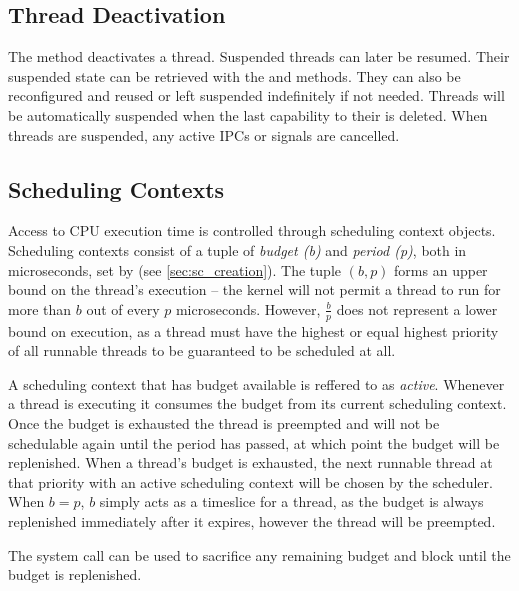 \subsection{Thread Deactivation}
\label{sec:thread_deactivation}

The  method deactivates a thread.
Suspended threads can later be resumed.
Their suspended state can be retrieved with the 
 and
 methods.
They can also be reconfigured and
reused or left suspended indefinitely if not needed. Threads will be
automatically suspended when the last capability to their  is
deleted.
When threads are suspended, any active IPCs or signals are cancelled.

\subsection{Scheduling Contexts}
\label{sec:scheduling_contexts}

Access to CPU execution time is controlled through scheduling context objects.
Scheduling contexts consist of a tuple of 
\textit{budget (b)} and \textit{period (p)}, both in microseconds, set by  (see \autoref{sec:sc_creation}).
The tuple $(b, p)$ forms an upper bound on the thread's execution -- 
the kernel will not permit a thread to run for more than $b$ out of every $p$ microseconds.
However, $\frac{b}{p}$ does not represent a lower bound on execution, as a thread must have the highest or equal highest priority of all runnable threads to be guaranteed to be scheduled at all.

A scheduling context that has budget available is reffered to as \emph{active}.
Whenever a thread is executing it consumes the budget from its current scheduling context.
Once the budget is exhausted the thread is preempted and will not be schedulable again until the period has passed, at which 
point the budget will be replenished.
When a thread's budget is exhausted, the next runnable thread at that priority with an active scheduling context will be chosen by the scheduler.
When $b = p$, $b$ simply acts as a timeslice for a thread, as the budget is always replenished immediately after it expires, however the thread will be preempted.

The system call  can be used to sacrifice any remaining budget and block until the budget is replenished.


